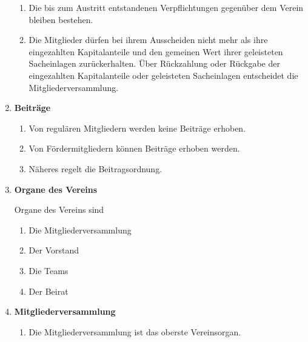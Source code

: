 \documentclass[german]{article}
\newcommand{\paragr}[1]{\item \textsf{\textbf{#1}}}
\begin{document}
\begin{enumerate}
\begin{enumerate}
\item Die bis zum Austritt entstandenen Verpflichtungen gegenüber dem Verein bleiben bestehen.

\item Die Mitglieder dürfen bei ihrem Ausscheiden nicht mehr als ihre eingezahlten Kapitalanteile und den gemeinen Wert ihrer geleisteten Sacheinlagen zurückerhalten.
Über Rückzahlung oder Rückgabe der eingezahlten Kapitalanteile oder geleisteten Sacheinlagen  entscheidet die Mitgliederversammlung.

\end{enumerate}


\paragr{Beiträge}
\begin{enumerate}

\item Von regulären Mitgliedern werden keine Beiträge erhoben.

\item Von Fördermitgliedern können Beiträge erhoben werden.

\item Näheres regelt die Beitragsordnung.

\end{enumerate}


\paragr{Organe des Vereins}

Organe des Vereins sind
\begin{enumerate}
\item Die Mitgliederversammlung
\item Der Vorstand
\item Die Teams
\item Der Beirat
\end{enumerate}


\paragr{Mitgliederversammlung}
\begin{enumerate}

\item Die Mitgliederversammlung ist das oberste Vereinsorgan.


\end{enumerate}
\end{enumerate}
\end{document}
